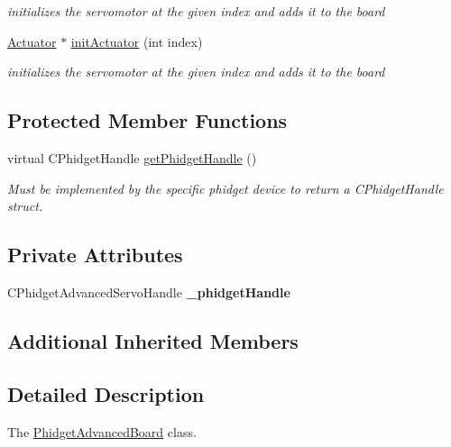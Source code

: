 \begin{DoxyCompactItemize}
\begin{DoxyCompactList}\small\item\em initializes the servomotor at the given index and adds it to the board \end{DoxyCompactList}\item 
\hyperlink{classdrobot_1_1device_1_1actuator_1_1Actuator}{Actuator} $\ast$ \hyperlink{classdrobot_1_1device_1_1actuator_1_1PhidgetAdvancedBoard_a1bc2bdc21b539dbf03effb0a662c318f}{init\-Actuator} (int index)
\begin{DoxyCompactList}\small\item\em initializes the servomotor at the given index and adds it to the board \end{DoxyCompactList}\end{DoxyCompactItemize}
\subsection*{Protected Member Functions}
\begin{DoxyCompactItemize}
\item 
virtual C\-Phidget\-Handle \hyperlink{classdrobot_1_1device_1_1actuator_1_1PhidgetAdvancedBoard_a67afbf98c18b80281226259f93fdb742}{get\-Phidget\-Handle} ()
\begin{DoxyCompactList}\small\item\em Must be implemented by the specific phidget device to return a C\-Phidget\-Handle struct. \end{DoxyCompactList}\end{DoxyCompactItemize}
\subsection*{Private Attributes}
\begin{DoxyCompactItemize}
\item 
\hypertarget{classdrobot_1_1device_1_1actuator_1_1PhidgetAdvancedBoard_aa7df489b3b5f23bbb1967538a1aef54a}{C\-Phidget\-Advanced\-Servo\-Handle {\bfseries \-\_\-phidget\-Handle}}\label{classdrobot_1_1device_1_1actuator_1_1PhidgetAdvancedBoard_aa7df489b3b5f23bbb1967538a1aef54a}

\end{DoxyCompactItemize}
\subsection*{Additional Inherited Members}


\subsection{Detailed Description}
The \hyperlink{classdrobot_1_1device_1_1actuator_1_1PhidgetAdvancedBoard}{Phidget\-Advanced\-Board} class. 


